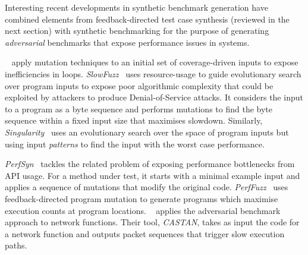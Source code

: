 Interesting recent developments in synthetic benchmark generation have combined elements from feedback-directed test case synthesis (reviewed in the next section) with synthetic benchmarking for the purpose of generating \emph{adversarial} benchmarks that expose performance issues in systems.

\citeauthor{Dhok2016}~\cite{Dhok2016} apply mutation techniques to an initial set of coverage-driven inputs to expose inefficiencies in loops.
\emph{SlowFuzz}~\cite{Petsios2017} uses resource-usage to guide evolutionary search over program inputs to expose poor algorithmic complexity that could be exploited by attackers to produce Denial-of-Service attacks. It considers the input to a program as a byte sequence and performs mutations to find the byte sequence within a fixed input size that maximises slowdown.
Similarly, \emph{Singularity}~\cite{Wei2018} uses an evolutionary search over the space of program inputs but using input \emph{patterns} to find the input with the worst case performance.

\emph{PerfSyn}~\cite{Toffola2018} tackles the related problem of exposing performance bottlenecks from API usage. For a method under test, it starts with a minimal example input and applies a sequence of mutations that modify the original code.
\emph{PerfFuzz}~\cite{Lemieux2018} uses feedback-directed program mutation to generate programs which maximise execution counts at program locations.
\citeauthor{Pedrosa2018}~\cite{Pedrosa2018} applies the adversarial benchmark approach to network functions. Their tool, \emph{CASTAN}, takes as input the code for a network function and outputs packet sequences that trigger slow execution paths.

